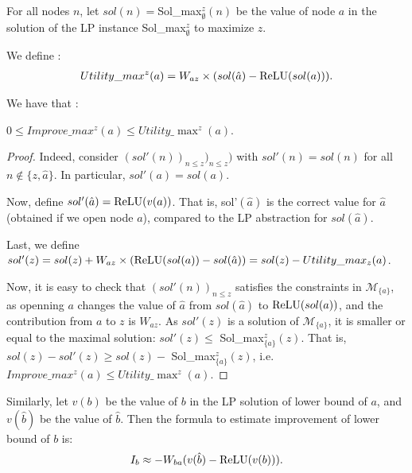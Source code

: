 \begin{definition}
	For all nodes $n$, let $sol(n)=$Sol\_max$_\emptyset^z(n)$ be the value of node $a$
	in the solution of the LP instance Sol\_max$_\emptyset^z$ to maximize $z$.
	
	We define : 
	\begin{align}
		Utility\_max^z(a) = W_{az} \times (sol(\hat{a})- \mathrm{ReLU}(sol(a))).
	\end{align}
	

We have that :

\begin{proposition}
$0 \leq Improve\_max^z(a) \leq Utility\_\max^z(a)$. 
\end{proposition}

\begin{proof}
Indeed, consider $(sol'(n))_{n \leq z})_{n \leq z})$ with
$sol'(n)=sol(n)$ for all $n \notin \{z,\hat{a}\}$.
In particular,  $sol'(a) = sol(a)$.

Now, define $sol'(\hat{a}) = \mathrm{ReLU}(v(a))$. 
That is,  
sol'$(\hat{a})$ is the correct value for $\hat{a}$ (obtained if we open node $a$), 
compared to the LP abstraction for $sol(\hat{a})$.

Last, we define $sol'(z)=sol(z) + W_{az} \times (\mathrm{ReLU}(sol(a)) - sol(\hat{a})) = sol(z) - Utility\_max_z(a)$.

Now, it is easy to check that $(sol'(n))_{n \leq z}$ satisfies the constraints in 
$\mathcal{M}_{\{a\}}$, as openning $a$ changes the value of $\hat{a}$ from
$sol(\hat{a})$ to $\mathrm{ReLU}(sol(a))$, and the contribution from $a$ to $z$ is 
$W_{az}$. As $sol'(z)$ is a solution of $\mathcal{M}_{\{a\}}$, it is smaller or equal to the maximal solution: $sol'(z) \leq$ Sol\_max$_{\{a\}}^z(z)$. That is, 
$sol(z)-sol'(z) \geq sol(z) -$ Sol\_max$_{\{a\}}^z(z)$, i.e. 
$Improve\_max^z(a) \leq Utility\_\max^z(a)$.
\end{proof}



	
	
	Similarly, let $v(b)$ be the value of $b$ in the LP solution of lower bound of $a$, and $v(\hat{b})$ be the value of $\hat{b}$. Then the formula to estimate improvement of lower bound of $b$ is: \begin{align*}
		I_b \approx -W_{ba}(v(\hat{b})-\mathrm{ReLU}(v(b))).
	\end{align*}
	
\end{definition}

